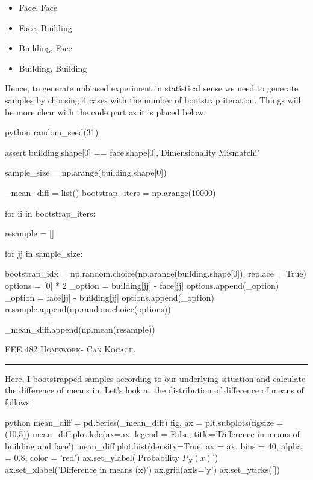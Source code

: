 \documentclass[12pt]{amsart}
\begin{document}
\begin{itemize}
    \item Face, Face
    \item Face, Building
    \item Building, Face
    \item Building, Building
\end{itemize}

Hence, to generate unbiased experiment in statistical sense we need to generate samples by choosing 4 cases with the number of bootstrap iteration. Things will be more clear with the code part as it is placed below.

\begin{mintedbox}{python}
random_seed(31)

assert building.shape[0] == face.shape[0],'Dimensionality Mismatch!'

sample_size = np.arange(building.shape[0])

_mean_diff = list()
bootstrap_iters  = np.arange(10000)

for ii in bootstrap_iters:
    
    resample = []
    
    for jj in sample_size:
        
        bootstrap_idx = np.random.choice(np.arange(building.shape[0]), replace = True)
        options = [0] * 2
        _option = building[jj] - face[jj]
        options.append(_option)
        _option = face[jj] - building[jj]
        options.append(_option)
        resample.append(np.random.choice(options))
        
    _mean_diff.append(np.mean(resample))

\end{mintedbox}

\newpage
{\scshape EEE 482} \hfill {\scshape \large  Homework-\relax} \hfill {\scshape Can Kocagil}
\smallskip
\hrule
\vspace{2mm}

Here, I bootstrapped samples according to our underlying situation and calculate the difference of means in. Let's look at the distribution of difference of means of follows.

\begin{mintedbox}{python}
mean_diff = pd.Series(_mean_diff)
fig, ax = plt.subplots(figsize = (10,5))
mean_diff.plot.kde(ax=ax, legend = False, title='Difference in means of building and face')
mean_diff.plot.hist(density=True, ax = ax, bins = 40, alpha = 0.8, color = 'red')
ax.set_ylabel('Probability $P_X(x)$')
ax.set_xlabel('Difference in means (x)')
ax.grid(axis='y')
ax.set_yticks([])

\end{mintedbox}
\end{document}
